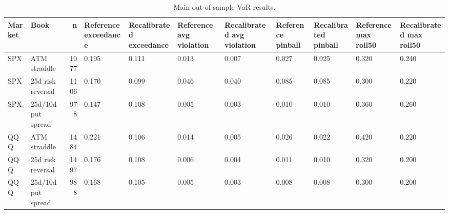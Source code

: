 \begin{table}
\caption{Main out-of-sample VaR results.}
\label{tab:main_results_generated}
\begin{tabular}{llrllllllll}
\toprule
Market & Book & n & Reference exceedance & Recalibrated exceedance & Reference avg violation & Recalibrated avg violation & Reference pinball & Recalibrated pinball & Reference max roll50 & Recalibrated max roll50 \\
\midrule
SPX & ATM straddle & 1077 & 0.195 & 0.111 & 0.013 & 0.007 & 0.027 & 0.025 & 0.320 & 0.240 \\
SPX & 25d risk reversal & 1106 & 0.170 & 0.099 & 0.046 & 0.040 & 0.085 & 0.085 & 0.300 & 0.220 \\
SPX & 25d/10d put spread & 978 & 0.147 & 0.108 & 0.005 & 0.003 & 0.010 & 0.010 & 0.360 & 0.260 \\
QQQ & ATM straddle & 1484 & 0.221 & 0.106 & 0.014 & 0.005 & 0.026 & 0.022 & 0.420 & 0.220 \\
QQQ & 25d risk reversal & 1497 & 0.176 & 0.108 & 0.006 & 0.004 & 0.011 & 0.010 & 0.320 & 0.200 \\
QQQ & 25d/10d put spread & 988 & 0.168 & 0.105 & 0.005 & 0.003 & 0.008 & 0.008 & 0.300 & 0.200 \\
\bottomrule
\end{tabular}
\end{table}
